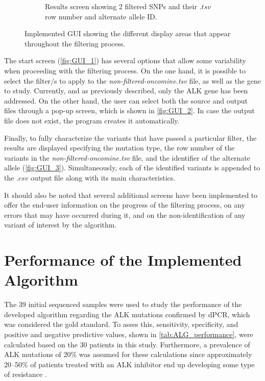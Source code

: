 \begin{figure}[ht]
\begin{subfigure}{0.52\textwidth}
        \caption{Results screen showing 2 filtered SNPs and their $.tsv$ row number and alternate allele ID.}
        \label{fig:GUI_3}
    \end{subfigure}
    \hfill
    \caption{Implemented GUI showing the different display areas that appear throughout the filtering process.}
    \label{fig:GUI}
\end{figure}

The start screen (\autoref{fig:GUI_1}) has several options that allow some variability when proceeding with the filtering process. On the one hand, it is possible to select the filter\slash s to apply to the \textit{non-filtered-oncomine.tsv} file, as well as the gene to study. Currently, and as previously described, only the ALK gene has been addressed. On the other hand, the user can select both the source and output files through a pop-up screen, which is shown in \autoref{fig:GUI_2}. In case the output file does not exist, the program creates it automatically.

Finally, to fully characterize the variants that have passed a particular filter, the results are displayed specifying the mutation type, the row number of the variants in the \textit{non-filtered-oncomine.tsv} file, and the identifier of the alternate allele (\autoref{fig:GUI_3}). Simultaneously, each of the identified variants is appended to the $.csv$ output file along with its main characteristics.

It should also be noted that several additional screens have been implemented to offer the end-user information on the progress of the filtering process, on any errors that may have occurred during it, and on the non-identification of any variant of interest by the algorithm.

\section{Performance of the Implemented Algorithm}

The 39 initial sequenced samples were used to study the performance of the developed algorithm regarding the ALK mutations confirmed by dPCR, which was considered the gold standard. To asses this, sensitivity, specificity, and positive and negative predictive values, shown in \autoref{tab:ALG_performance}, were calculated based on the 30 patients in this study. Furthermore, a prevalence of ALK mutations of 20\% was assumed for these calculations since approximately 20–50\% of patients treated with an ALK inhibitor end up developing some type of resistance \cite{TKI_resistance, ALK_resistance}. 

